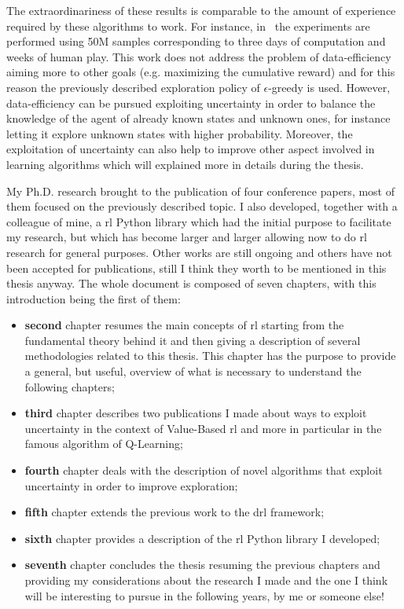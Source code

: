 The extraordinariness of these results is comparable to the amount of experience required by these algorithms to work. For instance, in~\cite{mnih2015human} the experiments are performed using 50M samples corresponding to three days of computation and weeks of human play. This work does not address the problem of data-efficiency aiming more to other goals (e.g. maximizing the cumulative reward) and for this reason the previously described exploration policy of $\epsilon$-greedy is used. However, data-efficiency can be pursued exploiting uncertainty in order to balance the knowledge of the agent of already known states and unknown ones, for instance letting it explore unknown states with higher probability. Moreover, the exploitation of uncertainty can also help to improve other aspect involved in learning algorithms which will explained more in details during the thesis.

My Ph.D. research brought to the publication of four conference papers, most of them focused on the previously described topic. I also developed, together with a colleague of mine, a \gls{rl} Python library which had the initial purpose to facilitate my research, but which has become larger and larger allowing now to do \gls{rl} research for general purposes. Other works are still ongoing and others have not been accepted for publications, still I think they worth to be mentioned in this thesis anyway. The whole document is composed of seven chapters, with this introduction being the first of them:
\begin{itemize}
 \item \textbf{second} chapter resumes the main concepts of \gls{rl} starting from the fundamental theory behind it and then giving a description of several methodologies related to this thesis. This chapter has the purpose to provide a general, but useful, overview of what is necessary to understand the following chapters;
 \item \textbf{third} chapter describes two publications I made about ways to exploit uncertainty in the context of Value-Based \gls{rl} and more in particular in the famous algorithm of Q-Learning;
 \item \textbf{fourth} chapter deals with the description of novel algorithms that exploit uncertainty in order to improve exploration;
 \item \textbf{fifth} chapter extends the previous work to the \gls{drl} framework;
 \item \textbf{sixth} chapter provides a description of the \gls{rl} Python library I developed;
 \item \textbf{seventh} chapter concludes the thesis resuming the previous chapters and providing my considerations about the research I made and the one I think will be interesting to pursue in the following years, by me or someone else!
\end{itemize}

